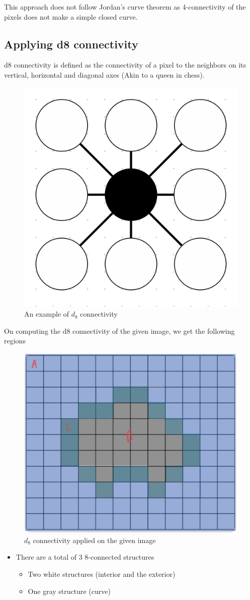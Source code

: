 \documentclass[a4paper,11pt]{article}
\begin{document}
This approach does not follow Jordan's curve theorem as 4-connectivity of the pixels does not make a simple closed curve.

\subsection{Applying d8 connectivity}

d8 connectivity is defined as the connectivity of a pixel to the neighbors on its vertical, horizontal and diagonal axes (Akin to a queen in chess). \newline
\begin{figure}[h]
    \centering
    \includegraphics[width=0.4\linewidth]{figs/d8_connectivity.png}
    \caption{An example of $d_8$ connectivity}
\end{figure}
\newline
On computing the d8 connectivity of the given image, we get the following regions
\begin{figure}[h]
    \centering
    \includegraphics[width=0.6\linewidth]{figs/d8_connected_image.png}
    \caption{$d_8$ connectivity applied on the given image}
\end{figure}

\begin{itemize}
    \item There are a total of 3 8-connected structures
    \begin{itemize}
        \item Two white structures (interior and the exterior)
        \item One gray structure (curve)
    \end{itemize}
\end{itemize}
\end{document}
